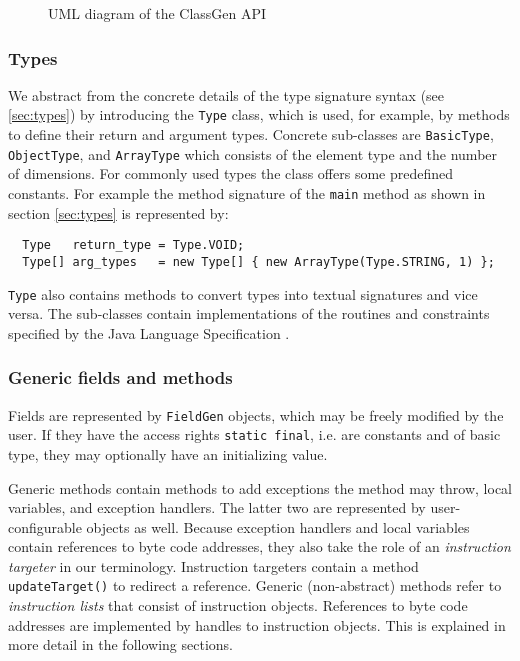 \documentclass[12pt,twoside]{article}
\begin{document}
\begin{figure}[htbp]
  \begin{center}
    \leavevmode
    \textheight
    \caption{UML diagram of the ClassGen API}\label{fig:umlcg}
  \end{center}
\end{figure}

\subsubsection{Types}

We abstract from the concrete details of the type signature syntax
(see \ref{sec:types}) by introducing the \texttt{Type} class, which is
used, for example, by methods to define their return and argument
types.  Concrete sub-classes are \texttt{BasicType},
\texttt{ObjectType}, and \texttt{ArrayType} which consists of the
element type and the number of dimensions. For commonly used types the
class offers some predefined constants.  For example the method
signature of the \texttt{main} method as shown in section
\ref{sec:types} is represented by:

\begin{verbatim}
  Type   return_type = Type.VOID;
  Type[] arg_types   = new Type[] { new ArrayType(Type.STRING, 1) };
\end{verbatim}

\texttt{Type} also contains methods to convert types into textual
signatures and vice versa. The sub-classes contain implementations of
the routines and constraints specified by the Java Language
Specification \cite{gosling}.

\subsubsection{Generic fields and methods}

Fields  are represented  by  \texttt{FieldGen} objects,  which may  be
freely  modified  by  the  user.   If  they  have  the  access  rights
\texttt{static final}, i.e. are constants  and of basic type, they may
optionally have an initializing value.

Generic  methods contain  methods  to add  exceptions  the method  may
throw,  local variables, and  exception handlers.  The latter  two are
represented by  user-configurable objects as  well.  Because exception
handlers  and   local  variables  contain  references   to  byte  code
addresses, they  also take the role of  an \emph{instruction targeter}
in   our  terminology.    Instruction  targeters   contain   a  method
\texttt{updateTarget()}    to   redirect    a    reference.    Generic
(non-abstract) methods refer  to \emph{instruction lists} that consist
of  instruction  objects.   References  to  byte  code  addresses  are
implemented by  handles to instruction  objects. This is  explained in
more detail in the following sections.
\end{document}
